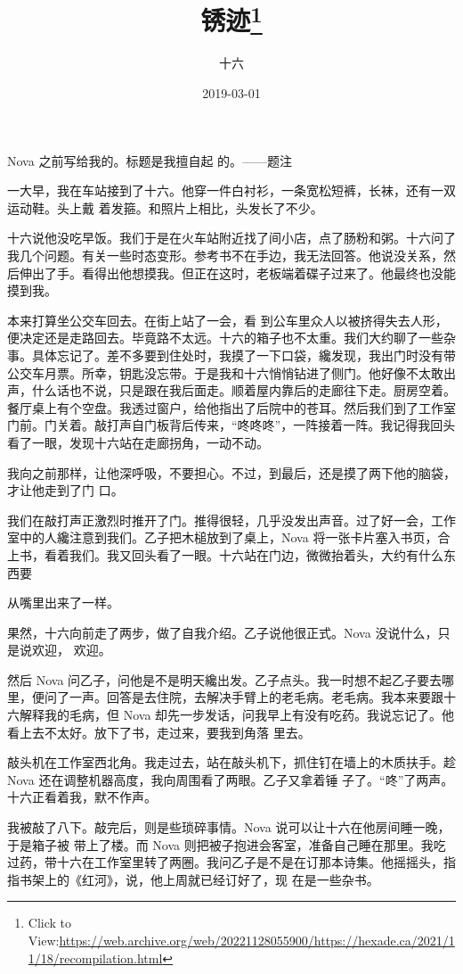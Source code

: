 \documentclass{article}
\title{锈迹\footnote{Click to View:\url{https://web.archive.org/web/20221128055900/https://hexade.ca/2021/11/18/recompilation.html}}}
\author{十六}
\date{2019-03-01}
\begin{document}

\maketitle


\Large

﻿Nova 之前写给我的。标题是我擅自起
的。——题注 

一大早，我在车站接到了十六。他穿一件白衬衫，一条宽松短裤，长袜，还有一双运动鞋。头上戴
着发箍。和照片上相比，头发长了不少。 

十六说他没吃早饭。我们于是在火车站附近找了间小店，点了肠粉和粥。十六问了我几个问题。有关一些时态变形。参考书不在手边，我无法回答。他说没关系，然后伸出了手。看得出他想摸我。但正在这时，老板端着碟子过来了。他最终也没能摸到我。
 

本来打算坐公交车回去。在街上站了一会，看
\newpage
到公车里众人以被挤得失去人形，便决定还是走路回去。毕竟路不太远。十六的箱子也不太重。我们大约聊了一些杂事。具体忘记了。差不多要到住处时，我摸了一下口袋，纔发现，我出门时没有带公交车月票。所幸，钥匙没忘带。于是我和十六悄悄钻进了侧门。他好像不太敢出声，什么话也不说，只是跟在我后面走。顺着屋内靠后的走廊往下走。厨房空着。餐厅桌上有个空盘。我透过窗户，给他指出了后院中的苍耳。然后我们到了工作室门前。门关着。敲打声自门板背后传来，“咚咚咚”，一阵接着一阵。我记得我回头看了一眼，发现十六站在走廊拐角，一动不动。

我向之前那样，让他深呼吸，不要担心。不过，到最后，还是摸了两下他的脑袋，才让他走到了门
口。 

我们在敲打声正激烈时推开了门。推得很轻，几乎没发出声音。过了好一会，工作室中的人纔注意到我们。乙子把木槌放到了桌上，Nova 将一张卡片塞入书页，合上书，看着我们。我又回头看了一眼。十六站在门边，微微抬着头，大约有什么东西要
\newpage

从嘴里出来了一样。 

果然，十六向前走了两步，做了自我介绍。乙子说他很正式。Nova 没说什么，只是说欢迎，
欢迎。 

然后 Nova 问乙子，问他是不是明天纔出发。乙子点头。我一时想不起乙子要去哪里，便问了一声。回答是去住院，去解决手臂上的老毛病。老毛病。我本来要跟十六解释我的毛病，但 Nova 却先一步发话，问我早上有没有吃药。我说忘记了。他看上去不太好。放下了书，走过来，要我到角落
里去。 

敲头机在工作室西北角。我走过去，站在敲头机下，抓住钉在墙上的木质扶手。趁 Nova 还在调整机器高度，我向周围看了两眼。乙子又拿着锤
子了。“咚”了两声。十六正看着我，默不作声。 

我被敲了八下。敲完后，则是些琐碎事情。Nova 说可以让十六在他房间睡一晚，于是箱子被
\newpage
带上了楼。而 Nova 则把被子抱进会客室，准备自己睡在那里。我吃过药，带十六在工作室里转了两圈。我问乙子是不是在订那本诗集。他摇摇头，指指书架上的《红河》，说，他上周就已经订好了，现
在是一些杂书。 
\end{document}
